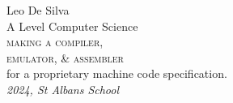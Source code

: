 \begin{titlepage}
	\raggedleft
	{\Large Leo De Silva\\[1in]}
	{\large A Level Computer Science\\}
	{\Huge\scshape making a compiler,\\ emulator, \& assembler\\[.2in]}
	{\large for a proprietary machine code specification.\\}
	\vfill
	{\itshape 2024, St Albans School}
\end{titlepage}
\restoregeometry
